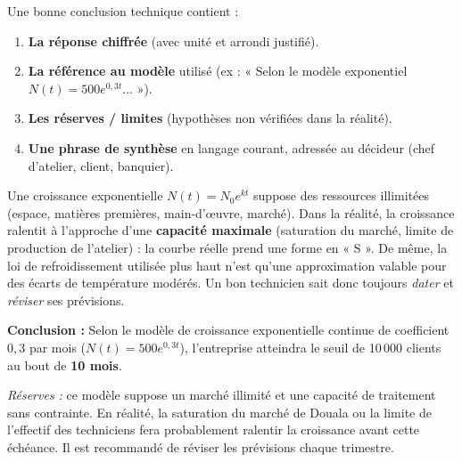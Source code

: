 \documentclass[11pt]{article}
\begin{document}
\begin{aretenir}
Une bonne conclusion technique contient :
\begin{enumerate}
    \item \textbf{La réponse chiffrée} (avec unité et arrondi justifié).
    \item \textbf{La référence au modèle} utilisé (ex : « Selon le modèle exponentiel $N(t)=500e^{0,3t}$... »).
    \item \textbf{Les réserves / limites} (hypothèses non vérifiées dans la réalité).
    \item \textbf{Une phrase de synthèse} en langage courant, adressée au décideur (chef d'atelier, client, banquier).
\end{enumerate}
\end{aretenir}

\begin{savaistu}
Une croissance exponentielle $N(t) = N_0 e^{kt}$ suppose des ressources illimitées (espace, matières premières, main-d'œuvre, marché). Dans la réalité, la croissance ralentit à l'approche d'une \textbf{capacité maximale} (saturation du marché, limite de production de l'atelier) : la courbe réelle prend une forme en « S ». De même, la loi de refroidissement utilisée plus haut n'est qu'une approximation valable pour des écarts de température modérés. Un bon technicien sait donc toujours \emph{dater} et \emph{réviser} ses prévisions.
\end{savaistu}

\begin{exemplebox}
\textbf{Conclusion :} Selon le modèle de croissance exponentielle continue de coefficient $0,3$ par mois ($N(t)=500e^{0,3t}$), l'entreprise atteindra le seuil de 10\,000 clients au bout de \textbf{10 mois}.

\emph{Réserves :} ce modèle suppose un marché illimité et une capacité de traitement sans contrainte. En réalité, la saturation du marché de Douala ou la limite de l'effectif des techniciens fera probablement ralentir la croissance avant cette échéance. Il est recommandé de réviser les prévisions chaque trimestre.
\end{exemplebox}
\end{document}

